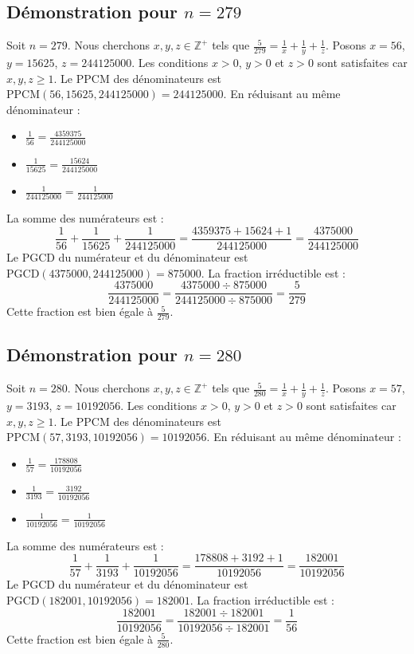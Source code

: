 \documentclass[11pt,a4paper]{article}
\begin{document}
\subsection{Démonstration pour $n = 279$}
Soit $n = 279$. Nous cherchons $x, y, z \in \mathbb{Z}^{+}$ tels que $\frac{5}{279} = \frac{1}{x} + \frac{1}{y} + \frac{1}{z}$.
Posons $x = 56$, $y = 15625$, $z = 244125000$.
Les conditions $x > 0$, $y > 0$ et $z > 0$ sont satisfaites car $x, y, z \geq 1$.
Le PPCM des dénominateurs est $\text{PPCM}(56, 15625, 244125000) = 244125000$.
En réduisant au même dénominateur :
\begin{itemize}
    \item $\frac{1}{56} = \frac{4359375}{244125000}$
    \item $\frac{1}{15625} = \frac{15624}{244125000}$
    \item $\frac{1}{244125000} = \frac{1}{244125000}$
\end{itemize}
La somme des numérateurs est :
$$ \frac{1}{56} + \frac{1}{15625} + \frac{1}{244125000} = \frac{4359375 + 15624 + 1}{244125000} = \frac{4375000}{244125000} $$
Le PGCD du numérateur et du dénominateur est $\text{PGCD}(4375000, 244125000) = 875000$.
La fraction irréductible est :
$$ \frac{4375000}{244125000} = \frac{4375000 \div 875000}{244125000 \div 875000} = \frac{5}{279} $$
Cette fraction est bien égale à $\frac{5}{279}$.

\subsection{Démonstration pour $n = 280$}
Soit $n = 280$. Nous cherchons $x, y, z \in \mathbb{Z}^{+}$ tels que $\frac{5}{280} = \frac{1}{x} + \frac{1}{y} + \frac{1}{z}$.
Posons $x = 57$, $y = 3193$, $z = 10192056$.
Les conditions $x > 0$, $y > 0$ et $z > 0$ sont satisfaites car $x, y, z \geq 1$.
Le PPCM des dénominateurs est $\text{PPCM}(57, 3193, 10192056) = 10192056$.
En réduisant au même dénominateur :
\begin{itemize}
    \item $\frac{1}{57} = \frac{178808}{10192056}$
    \item $\frac{1}{3193} = \frac{3192}{10192056}$
    \item $\frac{1}{10192056} = \frac{1}{10192056}$
\end{itemize}
La somme des numérateurs est :
$$ \frac{1}{57} + \frac{1}{3193} + \frac{1}{10192056} = \frac{178808 + 3192 + 1}{10192056} = \frac{182001}{10192056} $$
Le PGCD du numérateur et du dénominateur est $\text{PGCD}(182001, 10192056) = 182001$.
La fraction irréductible est :
$$ \frac{182001}{10192056} = \frac{182001 \div 182001}{10192056 \div 182001} = \frac{1}{56} $$
Cette fraction est bien égale à $\frac{5}{280}$.
\end{document}

